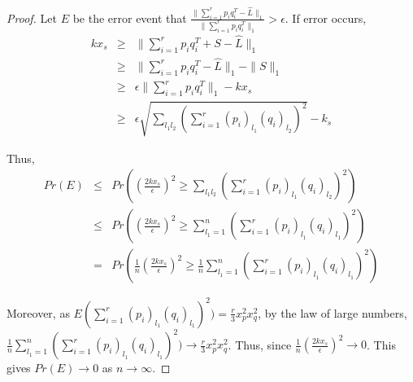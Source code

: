 \begin{proof}
Let $E$ be the error event that $\frac{\|\sum_{i=1}^{r}p_{i}q_{i}^{T}-\hat{L}\|_{1}}{\|\sum_{i=1}^{r}p_{i}q_{i}^{T}\|_{1}}>\epsilon$.
If error occurs,
\begin{eqnarray*}
kx_{s} & \ge & \|\sum_{i=1}^{r}p_{i}q_{i}^{T}+S-\hat{L}\|_{1}\\
 & \ge & \|\sum_{i=1}^{r}p_{i}q_{i}^{T}-\hat{L}\|_{1}-\|S\|_{1}\\
 & \ge & \epsilon\|\sum_{i=1}^{r}p_{i}q_{i}^{T}\|_{1}-kx_{s}\\
 & \ge & \epsilon\sqrt{\sum_{l_{1}l_{2}}(\sum_{i=1}^{r}(p_{i})_{l_{1}}(q_{i})_{l_{2}})^{2}}-k_{s}
\end{eqnarray*}


Thus,
\begin{eqnarray*}
Pr(E)
&\le & Pr \left( \left( \frac{2kx_{s}}{\epsilon} \right)^{2} \ge \sum_{l_{1}l_{2}} \left( \sum_{i=1}^{r}(p_{i})_{l_{1}}(q_{i})_{l_{2}} \right)^{2} \right)\\
&\le & Pr \left( \left( \frac{2kx_{s}}{\epsilon} \right)^{2} \ge \sum_{l_{1}=1}^{n} \left( \sum_{i=1}^{r}(p_{i})_{l_{1}}(q_{i})_{l_{1}} \right)^{2} \right)\\
&= & Pr \left( \frac{1}{n} \left( \frac{2kx_{s}}{\epsilon} \right)^{2} \ge \frac{1}{n} \sum_{l_{1}=1}^{n} \left( \sum_{i=1}^{r}(p_{i})_{l_{1}}(q_{i})_{l_{1}} \right)^{2} \right)
\end{eqnarray*}


Moreover, as $E(\sum_{i=1}^{r}(p_{i})_{l_{1}}(q_{i})_{l_{1}})^{2})=\frac{r}{3}x_{p}^{2}x_{q}^{2}$,
by the law of large numbers, $\frac{1}{n}\sum_{l_{1}=1}^{n}(\sum_{i=1}^{r}(p_{i})_{l_{1}}(q_{i})_{l_{1}})^{2})\to\frac{r}{3}x_{p}^{2}x_{q}^{2}$.
Thus, since $\frac{1}{n}(\frac{2kx_{s}}{\epsilon})^{2}\to0$. This
gives $Pr(E)\to0$ as $n\to\infty$.
\end{proof}

